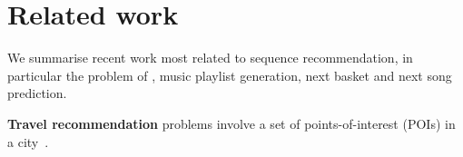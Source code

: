 




\section{Related work}
\label{sec:related}


We summarise recent work most related to sequence recommendation, 
in particular the problem of \trajrec, music playlist generation,
next basket and next song prediction.


{\bf Travel recommendation}
problems involve a set of points-of-interest (POIs) %
in a city~\cite{bao2015recommendations,zheng2015trajectory,zheng2014urban}.

